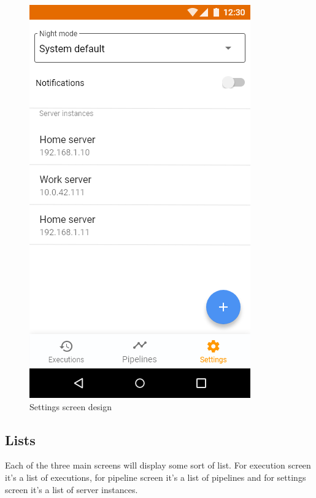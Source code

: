 \begin{figure}
\begin{minipage}[b]{0.32\textwidth}
    	\includegraphics[width=\textwidth]{pics/xd/Bottom Navigation - settings.png}
    	\caption[Settings]{Settings screen design}\label{fig:xdSettings}
    \end{minipage}
\end{figure}

\subsection{Lists}
Each of the three main screens will display some sort of list.
For execution screen it's a list of executions, for pipeline screen it's a list of pipelines and for settings screen it's a list of server instances.


